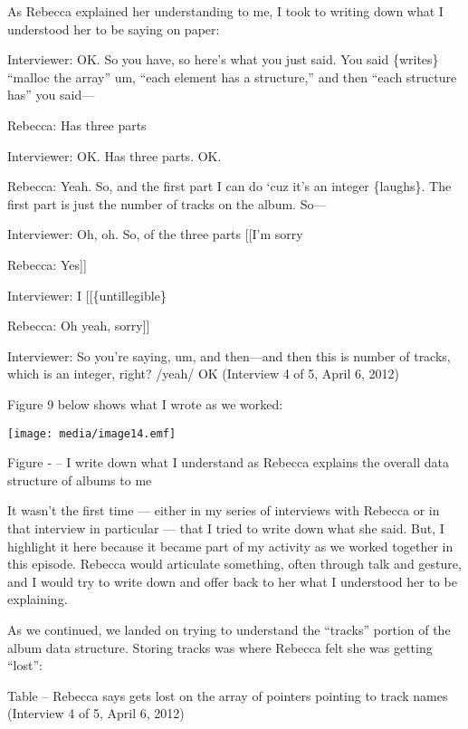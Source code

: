 As Rebecca explained her understanding to me, I took to writing down
what I understood her to be saying on paper:

Interviewer: OK. So you have, so here's what you just said. You said
\{writes\} ``malloc the array'' um, ``each element has a structure,''
and then ``each structure has'' you said---

Rebecca: Has three parts

Interviewer: OK. Has three parts. OK.

Rebecca: Yeah. So, and the first part I can do `cuz it's an integer
\{laughs\}. The first part is just the number of tracks on the album.
So---

Interviewer: Oh, oh. So, of the three parts {[}{[}I'm sorry

Rebecca: Yes{]}{]}

Interviewer: I {[}{[}\{untillegible\}

Rebecca: Oh yeah, sorry{]}{]}

Interviewer: So you're saying, um, and then---and then this is number of
tracks, which is an integer, right? /yeah/ OK (Interview 4 of 5, April
6, 2012)

Figure 9 below shows what I wrote as we worked:

\texttt{[image: media/image14.emf]}

\protect\hypertarget{ux5fToc252445973}{}{}Figure ‑ -- I write down what
I understand as Rebecca explains the overall data structure of albums to
me

It wasn't the first time --- either in my series of interviews with
Rebecca or in that interview in particular --- that I tried to write
down what she said. But, I highlight it here because it became part of
my activity as we worked together in this episode. Rebecca would
articulate something, often through talk and gesture, and I would try to
write down and offer back to her what I understood her to be explaining.

As we continued, we landed on trying to understand the ``tracks''
portion of the album data structure. Storing tracks was where Rebecca
felt she was getting ``lost'':

\protect\hypertarget{ux5fToc252445962}{}{}Table -- Rebecca says gets
lost on the array of pointers pointing to track names (Interview 4 of 5,
April 6, 2012)

